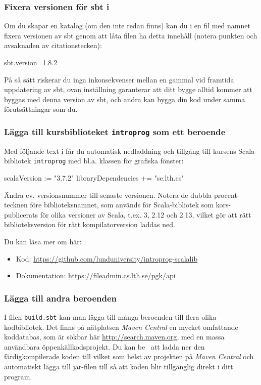 \subsubsection{Fixera versionen för sbt i }
Om du skapar en katalog  (om den inte redan finns) kan du i en fil med namnet  fixera versionen av sbt genom att låta filen ha detta innehåll (notera punkten och avsaknaden av citationstecken):
\begin{Code}
sbt.version=1.8.2
\end{Code}
På så sätt riskerar du inga inkonsekvenser mellan en gammal  vid framtida uppdatering av sbt, ovan inställning garanterar att ditt bygge alltid kommer att byggas med denna version av sbt, och andra kan bygga din kod under samma förutsättningar som du.

\subsubsection{Lägga till kursbiblioteket \texttt{introprog} som ett beroende}

Med följande text i  får du automatisk nedladdning och tillgång till kursens Scala-bibliotek \texttt{introprog} med bl.a. klassen  för grafiska fönster:

\begin{Code}
scalaVersion := "3.7.2"
libraryDependencies += "se.lth.cs" %
\end{Code}
Ändra ev. versionsnummer till senaste versionen. Notera de dubbla procent-tecknen före biblioteksnamnet, som används för Scala-bibliotek som kors-publicerats för olika versioner av Scala, t.ex. 3, 2.12 och 2.13, vilket gör att rätt biblioteksversion för rätt kompilatorversion laddas ned.

Du kan läsa mer om  här: 
\begin{itemize}
  \item Kod: \url{https://github.com/lunduniversity/introprog-scalalib}
	\item Dokumentation: \url{https://fileadmin.cs.lth.se/pgk/api}
\end{itemize}


\subsubsection{Lägga till andra beroenden}

I filen \texttt{build.sbt} kan man lägga till många beroenden till flera olika kodbibliotek. Det finns på nätplatsen \textit{Maven Central} en mycket omfattande koddatabas, som är sökbar här \url{http://search.maven.org}, med en massa användbara öppenkällkodsprojekt. Du kan be \sbt\ att ladda ner den färdigkompilerade koden till vilket som helst av projekten på \textit{Maven Central} och automatiskt lägga till jar-filen till  så att koden blir tillgänglig direkt i ditt program.

